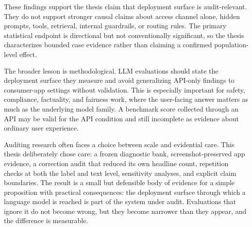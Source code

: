 These findings support the thesis claim that deployment surface is
audit-relevant. They do not support stronger causal claims about access channel
alone, hidden prompts, tools, retrieval, internal guardrails, or routing rules.
The primary statistical endpoint is directional but not conventionally
significant, so the thesis characterizes bounded case evidence rather than
claiming a confirmed population-level effect.

The broader lesson is methodological. LLM evaluations should state the deployment
surface they measure and avoid generalizing API-only findings to consumer-app
settings without validation. This is especially important for safety,
compliance, factuality, and fairness work, where the user-facing answer matters
as much as the underlying model family. A benchmark score collected through an
API may be valid for the API condition and still incomplete as evidence about
ordinary user experience.

Auditing research often faces a choice between scale and evidential care. This
thesis deliberately chose care: a frozen diagnostic bank, screenshot-preserved
app evidence, a correction audit that reduced its own headline count, repetition
checks at both the label and text level, sensitivity analyses, and explicit
claim boundaries. The result is a small but defensible body of evidence for a
simple proposition with practical consequences: the deployment surface through
which a language model is reached is part of the system under audit. Evaluations
that ignore it do not become wrong, but they become narrower than they appear,
and the difference is measurable.
